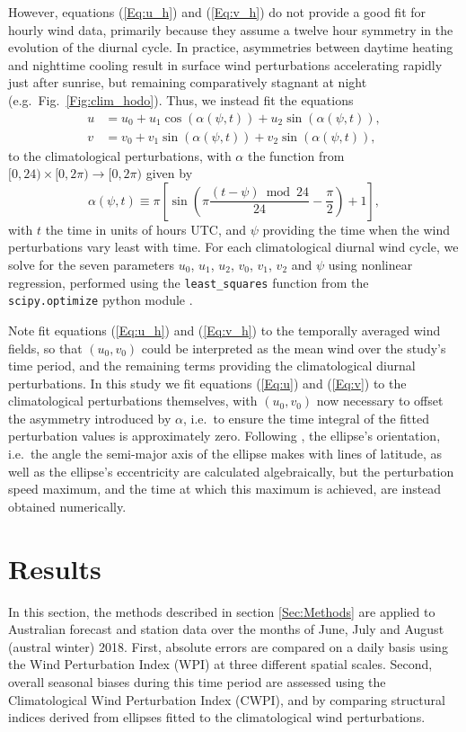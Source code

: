 \documentclass{ametsoc}
\begin{document}
However, equations (\ref{Eq:u_h}) and (\ref{Eq:v_h}) do not provide a good fit for hourly wind data, primarily because they assume a twelve hour symmetry in the evolution of the diurnal cycle. In practice, asymmetries between daytime heating and nighttime cooling \citep[e.g.][]{svensson11} result in surface wind perturbations accelerating rapidly just after sunrise, but remaining comparatively stagnant at night (e.g.~Fig.~\ref{Fig:clim_hodo}). Thus, we instead fit the equations
\begin{align}
u &= u_0 + u_1 \cos(\alpha(\psi,t)) + u_2 \sin(\alpha(\psi,t)), \label{Eq:u} \\
v &= v_0 + v_1 \sin(\alpha(\psi,t)) + v_2 \sin(\alpha(\psi,t)), \label{Eq:v}
\end{align}
to the climatological perturbations, with $\alpha$ the function from $[0,24) \times [0, 2\pi) \to [0, 2\pi)$ given by
\begin{equation}
\alpha(\psi,t) \equiv \pi \left[\sin\left( \pi \frac{(t - \psi)  \bmod 24}{24} - \frac{\pi}{2} \right) + 1 \right], \label{Eq:alpha}
\end{equation}
with $t$ the time in units of hours UTC, and $\psi$ providing the time when the wind perturbations vary least with time. For each climatological diurnal wind cycle, we solve for the seven parameters $u_0$, $u_1$, $u_2$, $v_0$, $v_1$, $v_2$ and $\psi$ using nonlinear regression, performed using the \texttt{least\_squares} function from the \texttt{scipy.optimize} python module \citep{scipy19}.

Note \citet{gille05} fit equations (\ref{Eq:u_h}) and (\ref{Eq:v_h}) to the temporally averaged wind fields, so that $\left(u_0, v_0\right)$ could be interpreted as the mean wind over the study's time period, and the remaining terms providing the climatological diurnal perturbations. In this study we fit equations (\ref{Eq:u}) and (\ref{Eq:v}) to the climatological perturbations themselves, with $\left(u_0, v_0\right)$ now necessary to offset the asymmetry introduced by $\alpha$, i.e.~to ensure the time integral of the fitted perturbation values is approximately zero. Following \citet{gille05}, the ellipse's orientation, i.e.~the angle the semi-major axis of the ellipse makes with lines of latitude, as well as the ellipse's eccentricity are calculated algebraically, but the perturbation speed maximum, and the time at which this maximum is achieved, are instead obtained numerically.

\section{Results}
\label{Sec:Results}
In this section, the methods described in section \ref{Sec:Methods} are applied to Australian forecast and station data over the months of June, July and August (austral winter) 2018. First, absolute errors are compared on a daily basis using the Wind Perturbation Index (WPI) at three different spatial scales. Second, overall seasonal biases during this time period are assessed using the Climatological Wind Perturbation Index (CWPI), and by comparing structural indices derived from ellipses fitted to the climatological wind perturbations. 
\end{document}
